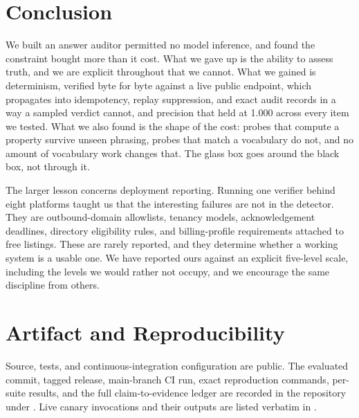 \section{Conclusion}

We built an answer auditor permitted no model inference, and found the constraint bought
more than it cost. What we gave up is the ability to assess truth, and we are explicit
throughout that we cannot. What we gained is determinism, verified byte for byte against a
live public endpoint, which propagates into idempotency, replay suppression, and exact audit
records in a way a sampled verdict cannot, and precision that held at 1.000 across every
item we tested. What we also found is the shape of the cost: probes that compute a property
survive unseen phrasing, probes that match a vocabulary do not, and no amount of vocabulary
work changes that. The glass box goes around the black box, not through it.

The larger lesson concerns deployment reporting. Running one verifier behind eight platforms
taught us that the interesting failures are not in the detector. They are outbound-domain
allowlists, tenancy models, acknowledgement deadlines, directory eligibility rules, and
billing-profile requirements attached to free listings. These are rarely reported, and they
determine whether a working system is a usable one. We have reported ours against an
explicit five-level scale, including the levels we would rather not occupy, and we encourage
the same discipline from others.

\section*{Artifact and Reproducibility}

Source, tests, and continuous-integration configuration are public. The evaluated commit,
tagged release, main-branch CI run, exact reproduction commands, per-suite results, and the
full claim-to-evidence ledger are recorded in the repository under . Live
canary invocations and their outputs are listed verbatim in
.





